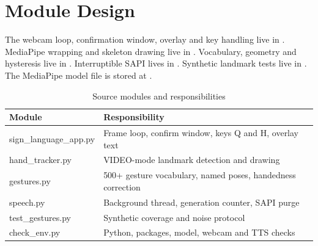 \section{Module Design}
The webcam loop, confirmation window, overlay and key handling live in . MediaPipe wrapping and skeleton drawing live in . Vocabulary, geometry and hysteresis live in . Interruptible SAPI lives in . Synthetic landmark tests live in . The MediaPipe model file is stored at .

\begin{table}[H]
\centering
\small
\caption{Source modules and responsibilities}
\label{tab:modules}
\begin{tabularx}{\textwidth}{@{}>{\raggedright\arraybackslash}p{3.6cm} L@{}}
\toprule
\textbf{Module} & \textbf{Responsibility} \\
\midrule
sign\_language\_app.py & Frame loop, confirm window, keys Q and H, overlay text \\
hand\_tracker.py & VIDEO-mode landmark detection and drawing \\
gestures.py & 500+ gesture vocabulary, named poses, handedness correction \\
speech.py & Background thread, generation counter, SAPI purge \\
test\_gestures.py & Synthetic coverage and noise protocol \\
check\_env.py & Python, packages, model, webcam and TTS checks \\
\bottomrule
\end{tabularx}
\end{table}
